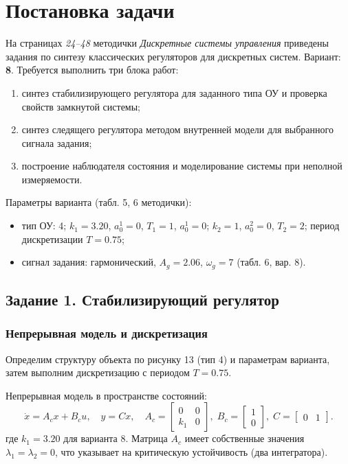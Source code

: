 
\chapter{Постановка задачи}
На страницах \textit{24--48} методички \textit{Дискретные системы управления} приведены задания по синтезу классических регуляторов для дискретных систем. Вариант: \textbf{8}. Требуется выполнить три блока работ: 
\begin{enumerate}
    \item синтез стабилизирующего регулятора для заданного типа ОУ и проверка свойств замкнутой системы; 
    \item синтез следящего регулятора методом внутренней модели для выбранного сигнала задания; 
    \item построение наблюдателя состояния и моделирование системы при неполной измеряемости.
\end{enumerate}

Параметры варианта (табл. 5, 6 методички):
\begin{itemize}
    \item тип ОУ: 4; $k_1=3.20$, $a_0^1=0$, $T_1=1$, $a_0^1=0$; $k_2=1$, $a_0^2=0$, $T_2=2$; период дискретизации $T=0.75$;
    \item сигнал задания: гармонический, $A_g=2.06$, $\omega_g=7$ (табл. 6, вар. 8).
\end{itemize}

\section{Задание 1. Стабилизирующий регулятор}
\subsection{Непрерывная модель и дискретизация}
Определим структуру объекта по рисунку 13 (тип 4) и параметрам варианта, затем выполним дискретизацию с периодом $T=0.75$. 

Непрерывная модель в пространстве состояний:
\[\label{eq:cont_model}
\dot x = A_c x + B_c u,\quad y = C x,\quad 
A_c = \begin{bmatrix}0 & 0\\ k_1 & 0\end{bmatrix},\; B_c = \begin{bmatrix}1\\0\end{bmatrix},\; C=\begin{bmatrix}0 & 1\end{bmatrix}.
\]
где $k_1=3.20$ для варианта 8. Матрица $A_c$ имеет собственные значения $\lambda_1=\lambda_2=0$, что указывает на критическую устойчивость (два интегратора).

